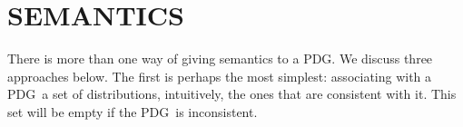 \documentclass{article}
\newcommand{\commentout}[1]{\ignorespaces}
\newcommand{\modelname}{probabilistic dependency graph}
\newcommand{\modelnames}{\modelname s}
\newcommand{\MN}{PDG}
\newcommand{\MNs}{\MN s}
\numberwithin{equation}{section}
\begin{document}
	\section{SEMANTICS}\label{sec:semantics}
	
        There is more than one way of giving semantics to
          a \MN.  We discuss three approaches below.
The first is perhaps the most simplest: associating
                    with a \MN\ a set of distributions, intuitively,
                    the ones that are consistent with it.
This set will be empty if the \MN\ is inconsistent.
\end{document}
